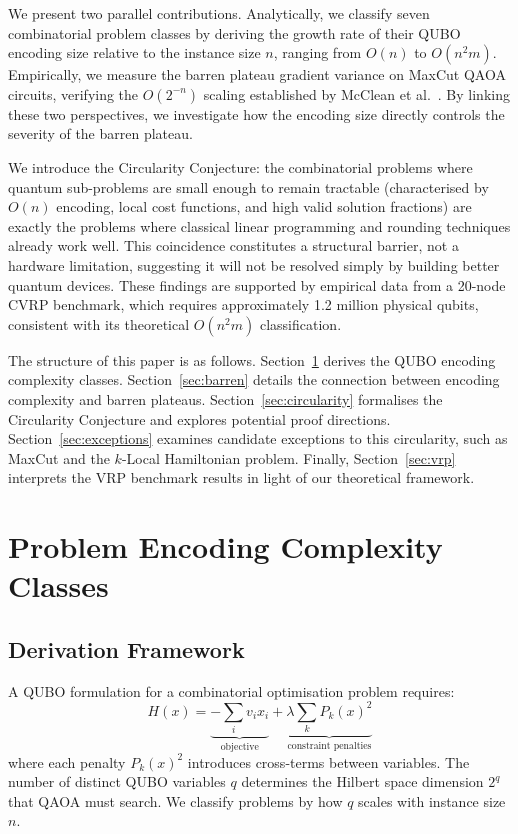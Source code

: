 \documentclass[11pt]{article}
\theoremstyle{remark}
\begin{document}
We present two parallel contributions. Analytically, we classify seven combinatorial problem classes by deriving the growth rate of their QUBO encoding size relative to the instance size $n$, ranging from $O(n)$ to $O(n^2m)$. Empirically, we measure the barren plateau gradient variance on MaxCut QAOA circuits, verifying the $O(2^{-n})$ scaling established by McClean et al.~\cite{mcclean2018barren}. By linking these two perspectives, we investigate how the encoding size directly controls the severity of the barren plateau.

We introduce the Circularity Conjecture: the combinatorial problems where quantum sub-problems are small enough to remain tractable (characterised by $O(n)$ encoding, local cost functions, and high valid solution fractions) are exactly the problems where classical linear programming and rounding techniques already work well. This coincidence constitutes a structural barrier, not a hardware limitation, suggesting it will not be resolved simply by building better quantum devices. These findings are supported by empirical data from a 20-node CVRP benchmark, which requires approximately 1.2 million physical qubits, consistent with its theoretical $O(n^2m)$ classification.

The structure of this paper is as follows. Section~\ref{sec:encoding} derives the QUBO encoding complexity classes. Section~\ref{sec:barren} details the connection between encoding complexity and barren plateaus. Section~\ref{sec:circularity} formalises the Circularity Conjecture and explores potential proof directions. Section~\ref{sec:exceptions} examines candidate exceptions to this circularity, such as MaxCut and the $k$-Local Hamiltonian problem. Finally, Section~\ref{sec:vrp} interprets the VRP benchmark results in light of our theoretical framework.

\section{Problem Encoding Complexity Classes}
\label{sec:encoding}

\subsection{Derivation Framework}

A QUBO formulation for a combinatorial optimisation problem requires:
\begin{equation}
  H(x) = \underbrace{-\sum_i v_i x_i}_{\text{objective}}
        + \underbrace{\lambda \sum_k P_k(x)^2}_{\text{constraint penalties}}
\end{equation}
where each penalty $P_k(x)^2$ introduces cross-terms between variables.
The number of distinct QUBO variables $q$ determines the Hilbert space
dimension $2^q$ that QAOA must search. We classify problems by how $q$
scales with instance size $n$.
\end{document}
